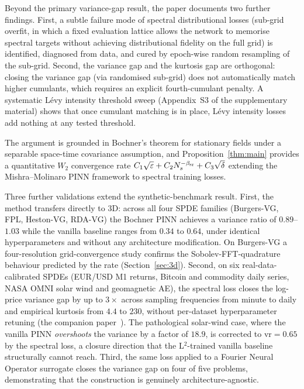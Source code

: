 \documentclass[review,12pt]{elsarticle}
\begin{document}
Beyond the primary variance-gap result, the paper documents two
further findings. First, a subtle failure mode of spectral
distributional losses (sub-grid overfit, in which a fixed
evaluation lattice allows the network to memorise spectral targets
without achieving distributional fidelity on the full grid)
is identified, diagnosed from data, and cured by epoch-wise random
resampling of the sub-grid. Second, the variance gap and the
kurtosis gap are orthogonal: closing the variance gap (via
randomised sub-grid) does not automatically match higher cumulants,
which requires an explicit fourth-cumulant penalty. A systematic
L\'evy intensity threshold sweep (Appendix~S3 of the supplementary material)
shows that once cumulant matching is in place, L\'evy intensity
losses add nothing at any tested threshold.

The argument is grounded in Bochner's theorem for stationary
fields under a separable space-time covariance assumption, and
Proposition~\ref{thm:main} provides a quantitative
\(W_2\) convergence rate
\(C_1\sqrt\varepsilon + C_2 N_s^{-\beta_{\rm sr}} + C_3\sqrt\delta\)
extending the Mishra--Molinaro PINN framework to spectral training
losses.

Three further validations extend the synthetic-benchmark result.
First, the method transfers directly to 3D: across all four SPDE families
(Burgers-VG, FPL, Heston-VG, RDA-VG) the Bochner PINN achieves a variance
ratio of \(0.89\)--\(1.03\) while the vanilla baseline ranges from
\(0.34\) to \(0.64\), under identical hyperparameters and without any
architecture modification. On Burgers-VG a four-resolution grid-convergence
study confirms the Sobolev-FFT-quadrature behaviour predicted by the rate
(Section~\ref{sec:3d}). Second, on six real-data-calibrated SPDEs
(EUR/USD M1 returns, Bitcoin and commodity daily series, NASA OMNI
solar wind and geomagnetic AE), the spectral loss closes the
log-price variance gap by up to \(3\times\) across sampling
frequencies from minute to daily and empirical kurtosis from \(4.4\)
to \(230\), without per-dataset hyperparameter retuning
(the companion paper~\citep{Lipski2026RealWorld}). The pathological solar-wind case,
where the vanilla PINN \emph{overshoots} the variance by a factor of
\(18.9\), is corrected to \(\mathrm{vr} = 0.65\) by the spectral
loss, a closure direction that the L\(^2\)-trained vanilla
baseline structurally cannot reach. Third, the same loss applied to
a Fourier Neural Operator surrogate closes the variance gap on four
of five problems, demonstrating that the construction is genuinely
architecture-agnostic.
\end{document}
